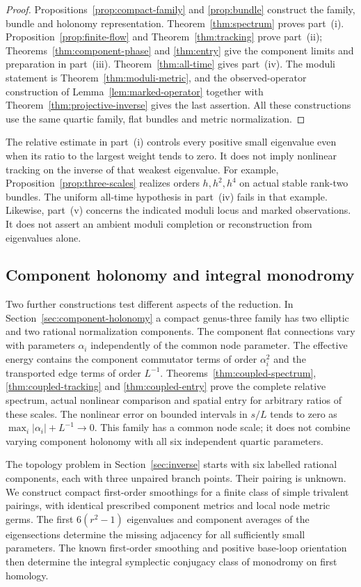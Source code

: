 \begin{proof}
Propositions~\ref{prop:compact-family} and
\ref{prop:bundle} construct the family, bundle
and holonomy representation. Theorem~\ref{thm:spectrum}
proves part~(i).
Proposition~\ref{prop:finite-flow} and
Theorem~\ref{thm:tracking} prove part~(ii);
Theorems~\ref{thm:component-phase} and
\ref{thm:entry} give the component limits and preparation
in part~(iii).
Theorem~\ref{thm:all-time} gives part~(iv).
The moduli statement is Theorem~\ref{thm:moduli-metric},
and the observed-operator construction of
Lemma~\ref{lem:marked-operator} together with
Theorem~\ref{thm:projective-inverse} gives the
last assertion. All these constructions use
the same quartic family, flat bundles and
metric normalization.
\end{proof}

The relative estimate in part~(i) controls every
positive small eigenvalue even when its ratio
to the largest weight tends to zero. It does
not imply nonlinear tracking on the inverse
of that weakest eigenvalue. For example,
Proposition~\ref{prop:three-scales} realizes
orders $h,h^2,h^4$ on actual stable rank-two
bundles. The uniform all-time hypothesis in
part~(iv) fails in that example.
Likewise, part~(v) concerns the indicated
moduli locus and marked observations. It does
not assert an ambient moduli completion or
reconstruction from eigenvalues alone.

\subsection{Component holonomy and integral monodromy}
Two further constructions test different aspects
of the reduction. In Section~\ref{sec:component-holonomy}
a compact genus-three family has two elliptic
and two rational normalization components.
The component flat connections vary with
parameters $\alpha_i$ independently of the
common node parameter. The effective energy
contains the component commutator terms of
order $\alpha_i^2$ and the transported edge
terms of order $L^{-1}$.
Theorems~\ref{thm:coupled-spectrum},
\ref{thm:coupled-tracking} and
\ref{thm:coupled-entry} prove the complete
relative spectrum, actual nonlinear comparison
and spatial entry for arbitrary ratios
of these scales. The nonlinear error on
bounded intervals in $s/L$ tends to zero
as $\max_i|\alpha_i|+L^{-1}\to0$.
This family has a common node scale;
it does not combine varying component
holonomy with all six independent quartic
parameters.

The topology problem in Section~\ref{sec:inverse}
starts with six labelled rational components,
each with three unpaired branch points.
Their pairing is unknown. We construct
compact first-order smoothings for a finite
class of simple trivalent pairings, with
identical prescribed component metrics and
local node metric germs. The first
$6(r^2-1)$ eigenvalues and component averages
of the eigensections determine the missing
adjacency for all sufficiently small parameters.
The known first-order smoothing and positive
base-loop orientation then determine the
integral symplectic conjugacy class of
monodromy on first homology.

